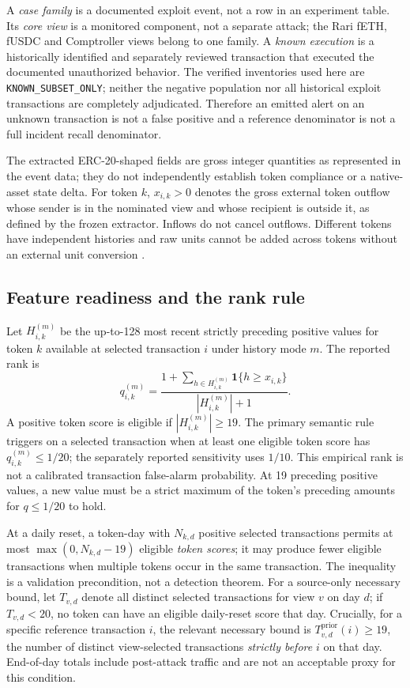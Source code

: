 \documentclass[preprint,12pt,authoryear]{elsarticle}
\begin{document}
A \emph{case family} is a documented exploit event, not a row in an experiment table. Its \emph{core view} is a monitored component, not a separate attack; the Rari fETH, fUSDC and Comptroller views belong to one family. A \emph{known execution} is a historically identified and separately reviewed transaction that executed the documented unauthorized behavior. The verified inventories used here are \texttt{KNOWN\_SUBSET\_ONLY}; neither the negative population nor all historical exploit transactions are completely adjudicated. Therefore an emitted alert on an unknown transaction is not a false positive and a reference denominator is not a full incident recall denominator.

The extracted ERC-20-shaped fields are gross integer quantities as represented in the event data; they do not independently establish token compliance or a native-asset state delta. For token $k$, $x_{i,k}>0$ denotes the gross external token outflow whose sender is in the nominated view and whose recipient is outside it, as defined by the frozen extractor. Inflows do not cancel outflows. Different tokens have independent histories and raw units cannot be added across tokens without an external unit conversion \citep{Vogelsteller2015ERC20}.

\subsection{Feature readiness and the rank rule}
Let $H_{i,k}^{(m)}$ be the up-to-128 most recent strictly preceding positive values for token $k$ available at selected transaction $i$ under history mode $m$. The reported rank is
\begin{equation}\label{eq:rank}
q_{i,k}^{(m)}=\frac{1+\sum_{h\in H_{i,k}^{(m)}}\mathbf{1}\{h\geq x_{i,k}\}}{|H_{i,k}^{(m)}|+1}.
\end{equation}
A positive token score is eligible if $|H_{i,k}^{(m)}|\geq 19$. The primary semantic rule triggers on a selected transaction when at least one eligible token score has $q_{i,k}^{(m)}\leq1/20$; the separately reported sensitivity uses $1/10$. This empirical rank is not a calibrated transaction false-alarm probability. At 19 preceding positive values, a new value must be a strict maximum of the token's preceding amounts for $q\leq1/20$ to hold.

At a daily reset, a token-day with $N_{k,d}$ positive selected transactions permits at most $\max(0,N_{k,d}-19)$ eligible \emph{token scores}; it may produce fewer eligible transactions when multiple tokens occur in the same transaction. The inequality is a validation precondition, not a detection theorem. For a source-only necessary bound, let $T_{v,d}$ denote all distinct selected transactions for view $v$ on day $d$; if $T_{v,d}<20$, no token can have an eligible daily-reset score that day. Crucially, for a specific reference transaction $i$, the relevant necessary bound is $T_{v,d}^{\mathrm{prior}}(i)\geq19$, the number of distinct view-selected transactions \emph{strictly before} $i$ on that day. End-of-day totals include post-attack traffic and are not an acceptable proxy for this condition.
\end{document}
